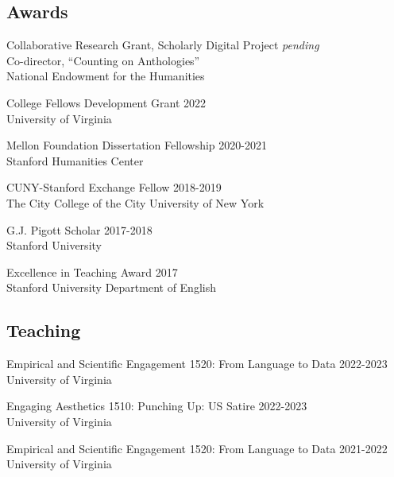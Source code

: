 \documentclass[
  12pt,
  letterpaper,
]{article}
\begin{document}
\hypertarget{awards}{%
\subsection{Awards}\label{awards}}

Collaborative Research Grant, Scholarly Digital Project
\hfill \emph{pending}\\
\hspace*{0.333em} Co-director, ``Counting on Anthologies''\\
\hspace*{0.333em} National Endowment for the Humanities

College Fellows Development Grant \hfill 2022\\
\hspace*{0.333em} University of Virginia

Mellon Foundation Dissertation Fellowship \hfill 2020-2021\\
\hspace*{0.333em} Stanford Humanities Center

CUNY-Stanford Exchange Fellow \hfill 2018-2019\\
\hspace*{0.333em} The City College of the City University of New York

G.J. Pigott Scholar \hfill 2017-2018\\
\hspace*{0.333em} Stanford University

Excellence in Teaching Award \hfill 2017\\
\hspace*{0.333em} Stanford University Department of English

\hypertarget{teaching}{%
\subsection{Teaching}\label{teaching}}

Empirical and Scientific Engagement 1520: From Language to Data
\hfill 2022-2023\\
\hspace*{0.333em} University of Virginia

Engaging Aesthetics 1510: Punching Up: US Satire \hfill 2022-2023\\
\hspace*{0.333em} University of Virginia

Empirical and Scientific Engagement 1520: From Language to Data
\hfill 2021-2022\\
\hspace*{0.333em} University of Virginia
\end{document}
